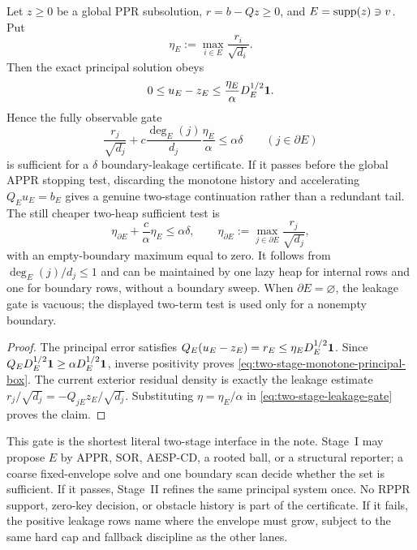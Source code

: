 \begin{corollary}
\label{cor:two-stage-monotone-leakage-screen}
Let $z\geq0$ be a global PPR subsolution, $r=b-Qz\geq0$, and
$E=\operatorname{supp}(z)\ni v$.  Put
\begin{equation}
 \eta_E:=\max_{i\in E}\frac{r_i}{\sqrt{d_i}}.
 \label{eq:two-stage-internal-key-scale}
\end{equation}
Then the exact principal solution obeys
\begin{equation}
 0\leq u_E-z_E
 \leq\frac{\eta_E}{\alpha}D_E^{1/2}\mathbf{1}.
 \label{eq:two-stage-monotone-principal-box}
\end{equation}
Hence the fully observable gate
\begin{equation}
 \frac{r_j}{\sqrt{d_j}}
 +c\frac{\deg_E(j)}{d_j}\frac{\eta_E}{\alpha}
 \leq\alpha\delta
 \qquad(j\in\partial E)
 \label{eq:two-stage-monotone-leakage-gate}
\end{equation}
is sufficient for a $\delta$ boundary-leakage certificate.  If it passes
before the global APPR stopping test, discarding the monotone history and
accelerating $Q_Eu_E=b_E$ gives a genuine two-stage continuation rather than
a redundant tail.
The still cheaper two-heap sufficient test is
\begin{equation}
 \eta_{\partial E}+\frac{c}{\alpha}\eta_E
 \leq\alpha\delta,
 \qquad
 \eta_{\partial E}:=
 \max_{j\in\partial E}\frac{r_j}{\sqrt{d_j}},
 \label{eq:two-stage-two-heap-leakage-gate}
\end{equation}
with an empty-boundary maximum equal to zero.  It follows from
$\deg_E(j)/d_j\leq1$ and can be maintained by one lazy heap for internal rows
and one for boundary rows, without a boundary sweep.  When
$\partial E=\varnothing$, the leakage gate is vacuous; the displayed
two-term test is used only for a nonempty boundary.
\end{corollary}

\begin{proof}
The principal error satisfies
$Q_E(u_E-z_E)=r_E\leq\eta_ED_E^{1/2}\mathbf{1}$.  Since
$Q_ED_E^{1/2}\mathbf{1}\geq\alpha D_E^{1/2}\mathbf{1}$, inverse positivity proves
\cref{eq:two-stage-monotone-principal-box}.  The current exterior residual
density is exactly the leakage estimate
$r_j/\sqrt{d_j}=-Q_{jE}z_E/\sqrt{d_j}$.  Substituting
$\eta=\eta_E/\alpha$ in
\cref{eq:two-stage-leakage-gate} proves the claim.
\end{proof}

This gate is the shortest literal two-stage interface in the note.  Stage~I
may propose $E$ by APPR, SOR, AESP-CD, a rooted ball, or a structural
reporter; a coarse fixed-envelope solve and one boundary scan decide whether
the set is sufficient.  If it passes, Stage~II refines the same principal
system once.  No RPPR support, zero-key decision, or obstacle history is part
of the certificate.  If it fails, the positive leakage rows name where the
envelope must grow, subject to the same hard cap and fallback discipline as
the other lanes.

